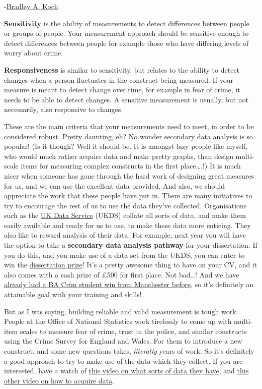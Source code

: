\documentclass[]{book}
\theoremstyle{definition}
\theoremstyle{definition}
\theoremstyle{definition}
\theoremstyle{remark}
\begin{document}
-\href{http://www.socingoutloud.com/2012/10/teaching-validity-and-reliability-in.html}{Bradley
A. Koch}

\textbf{Sensitivity} is the ability of measurements to detect
differences between people or groups of people. Your measurement
approach should be sensitive enough to detect differences between people
for example those who have differing levels of worry about crime.

\textbf{Responsiveness} is similar to sensitivity, but relates to the
ability to detect changes when a person fluctuates in the construct
being measured. If your measure is meant to detect change over time, for
example in fear of crime, it needs to be able to detect changes. A
sensitive measurement is usually, but not necessarily, also responsive
to changes.

These are the main criteria that your measurements need to meet, in
order to be considered robust. Pretty daunting, eh? No wonder secondary
data analysis is so popular! (Is it though? Well it should be. It is
amongst lazy people like myself, who would much rather acquire data and
make pretty graphs, than design multi-scale items for measuring complex
constructs in the first place\ldots{}.!) It is much nicer when someone
has gone through the hard work of designing great measures for us, and
we can use the excellent data provided. And also, we should appreciate
the work that these people have put in. There are many initiatives to
try to encourage the rest of us to use the data they've collected.
Organisations such as the \href{https://www.ukdataservice.ac.uk/}{UK
Data Service} (UKDS) collate all sorts of data, and make them easily
available and ready for us to use, to make these data more enticing.
They also like to reward analysis of their data. For example, next year
you will have the option to take a \textbf{secondary data analysis
pathway} for your dissertation. If you do this, and you make use of a
data set from the UKDS, you can enter to win the
\href{https://www.ukdataservice.ac.uk/use-data/student-resources/dissertation-prize}{dissertation
prize}! It's a pretty awesome thing to have on your CV, and it also
comes with a cash prize of £500 for first place. Not bad\ldots{}! And we
have
\href{https://www.ukdataservice.ac.uk/news-and-events/newsitem/?id=4650}{already
had a BA Crim student win from Manchester before}, so it's definitely an
attainable goal with your training and skills!

But as I was saying, building reliable and valid measurement is tough
work. People at the Office of National Statistics work tirelessly to
come up with multi-item scales to measure fear of crime, trust in the
police, and similar constructs using the Crime Survey for England and
Wales. For them to introduce a new construct, and some new questions
takes, \emph{literally} years of work. So it's definitely a good
approach to try to make use of the data which they collect. If you are
interested, have a watch of
\href{https://www.youtube.com/watch?v=cCpHnqn0Q2c\&list=PLG87Imnep1SljSqc0yLIHYBP1w0saMJn-\&index=2}{this
video on what sorts of data they have}, and
\href{https://www.youtube.com/watch?list=PLG87Imnep1SljSqc0yLIHYBP1w0saMJn-\&v=TzRWJK1MtrU}{this
other video on how to acquire data}.
\end{document}
